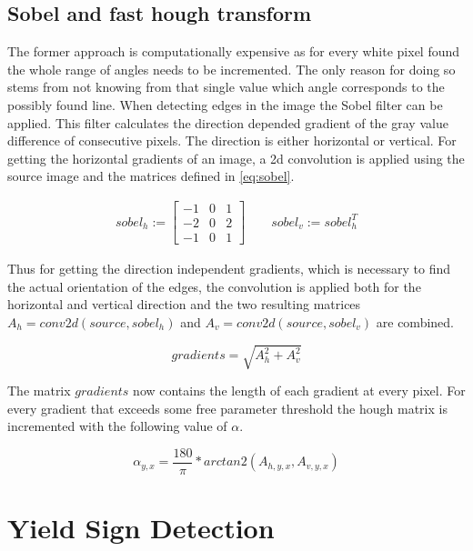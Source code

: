 \documentclass{report}
\begin{document}
\subsection{Sobel and fast hough transform}

The former approach is computationally expensive as for every white
pixel found the whole range of angles needs to be incremented. The
only reason for doing so stems from not knowing from that single value
which angle corresponds to the possibly found line. When detecting
edges in the image the Sobel filter can be applied. This filter
calculates the direction depended gradient of the gray value
difference of consecutive pixels. The direction is either horizontal
or vertical. For getting the horizontal gradients of an image, a 2d
convolution is applied using the source image and the matrices defined
in \ref{eq:sobel}.

\begin{equation}\label{eq:sobel}
  \begin{split}
    sobel_h := \begin{bmatrix}
      -1 & 0 & 1 \\
      -2 & 0 & 2 \\
      -1 & 0 & 1
    \end{bmatrix}
    \qquad
    sobel_v := sobel_h^T
    \end{split}
\end{equation}

Thus for getting the direction independent gradients, which is
necessary to find the actual orientation of the edges, the convolution
is applied both for the horizontal and vertical direction and the two
resulting matrices \( A_h = conv2d(source, sobel_h) \) and \( A_v =
conv2d(source, sobel_v) \) are combined.

\begin{equation}
  gradients = \sqrt{A_h^2 + A_v^2}
\end{equation}

The matrix \( gradients \) now contains the length of each gradient at
every pixel. For every gradient that exceeds some free parameter
threshold the hough matrix is incremented with the following value of
\( \alpha \).

\begin{equation}
  \alpha_{y, x} = \frac{180}{\pi} * arctan2(A_{h,y,x}, A_{v,y,x})
\end{equation}

\section{Yield Sign Detection}
\label{sec:pipeline_yielddet}
\end{document}
